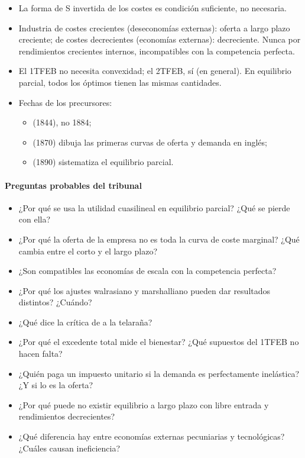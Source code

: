 \documentclass[11pt]{article}
\begin{document}
\begin{itemize}
\begin{itemize}
  \end{itemize}
\item La forma de S invertida de los costes es condición suficiente, no necesaria.
\item Industria de costes crecientes (deseconomías externas): oferta a largo plazo creciente; de costes decrecientes (economías externas): decreciente. Nunca por rendimientos crecientes internos, incompatibles con la competencia perfecta.
\item El 1TFEB no necesita convexidad; el 2TFEB, sí (en general). En equilibrio parcial, todos los óptimos tienen las mismas cantidades.
\item Fechas de los precursores:
  \begin{itemize}
  \item {} (1844), no 1884;
  \item {} (1870) dibuja las primeras curvas de oferta y demanda en inglés;
  \item {} (1890) sistematiza el equilibrio parcial.
  \end{itemize}
\end{itemize}

\paragraph{Preguntas probables del tribunal}

\begin{itemize}
\item ¿Por qué se usa la utilidad cuasilineal en equilibrio parcial? ¿Qué se pierde con ella?
\item ¿Por qué la oferta de la empresa no es toda la curva de coste marginal? ¿Qué cambia entre el corto y el largo plazo?
\item ¿Son compatibles las economías de escala con la competencia perfecta?
\item ¿Por qué los ajustes walrasiano y marshalliano pueden dar resultados distintos? ¿Cuándo?
\item ¿Qué dice la crítica de  a la telaraña?
\item ¿Por qué el excedente total mide el bienestar? ¿Qué supuestos del 1TFEB no hacen falta?
\item ¿Quién paga un impuesto unitario si la demanda es perfectamente inelástica? ¿Y si lo es la oferta?
\item ¿Por qué puede no existir equilibrio a largo plazo con libre entrada y rendimientos decrecientes?
\item ¿Qué diferencia hay entre economías externas pecuniarias y tecnológicas? ¿Cuáles causan ineficiencia?
\end{itemize}

\bibliografia
\end{document}

